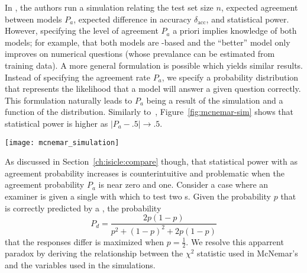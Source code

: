 In \citet{card2020power}, the authors run a simulation relating the test set size $n$, expected agreement between models $P_a$, expected difference in accuracy $\delta_{\text{acc}}$, and statistical power.
However, specifying the level of agreement $P_a$ a priori implies knowledge of both models; for example, that both models are \bert{}-based and the ``better'' model only improves on numerical questions (whose prevalance can be estimated from training data).
A more general formulation is possible which yields similar results.
Instead of specifying the agreement rate $P_a$, we specify a probability distribution that represents the likelihood that a model will answer a given question correctly.
This formulation naturally leads to $P_a$ being a result of the simulation and a function of the distribution.
Similarly to~\citet{card2020power}, Figure~\ref{fig:mcnemar-sim} shows that statistical power is higher as $|P_a-.5|\rightarrow .5$.

\begin{figure*}[th]
    \centering
    \texttt{[image: mcnemar\_simulation]}
    \caption{
    }
    \label{fig:mcnemar-sim}
\end{figure*}

As discussed in Section~\ref{ch:isicle:compare} though, that statistical power  with as agreement probability increases is counterintuitive and problematic when the agreement probability $P_a$ is near zero and one.
Consider a case where an examiner is given a single \itm{} with which to test two \subj{}s.
Given the probability $p$ that \itm{} is correctly predicted by a \subj{}, the probability
\begin{equation}
    P_d=\frac{2p(1-p)}{p^2+(1-p)^2+2p(1-p)}
\end{equation}
that the \subj{} responses differ is maximized when $p=\frac{1}{2}$.
We resolve this apparrent paradox by deriving the relationship between the $\chi^2$ statistic used in McNemar's and the variables used in the simulations.

